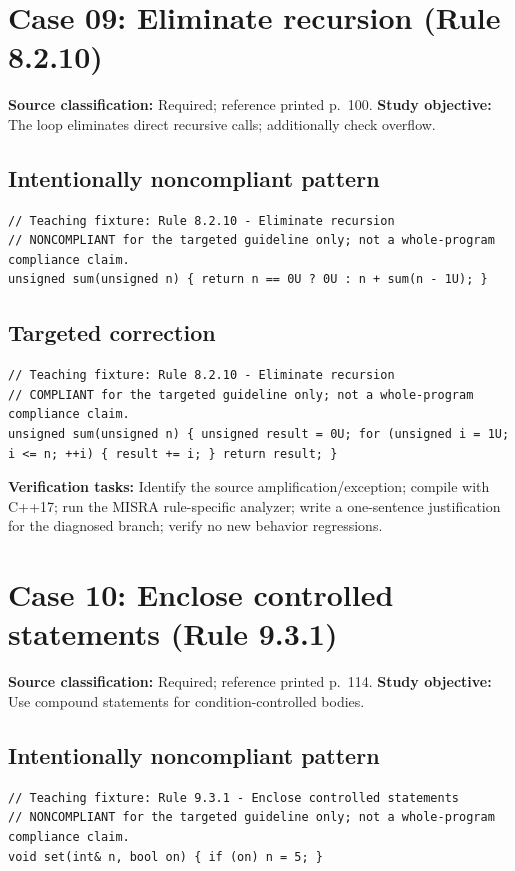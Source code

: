 \documentclass[10pt,letterpaper]{article}
\begin{document}
\section{Case 09: Eliminate recursion (Rule 8.2.10)}
\textbf{Source classification:} Required; reference printed p.~100. \textbf{Study objective:} The loop eliminates direct recursive calls; additionally check overflow.
\subsection*{Intentionally noncompliant pattern}
\begin{lstlisting}
// Teaching fixture: Rule 8.2.10 - Eliminate recursion
// NONCOMPLIANT for the targeted guideline only; not a whole-program compliance claim.
unsigned sum(unsigned n) { return n == 0U ? 0U : n + sum(n - 1U); }
\end{lstlisting}
\subsection*{Targeted correction}
\begin{lstlisting}
// Teaching fixture: Rule 8.2.10 - Eliminate recursion
// COMPLIANT for the targeted guideline only; not a whole-program compliance claim.
unsigned sum(unsigned n) { unsigned result = 0U; for (unsigned i = 1U; i <= n; ++i) { result += i; } return result; }
\end{lstlisting}
\textbf{Verification tasks:} Identify the source amplification/exception; compile with C++17; run the MISRA rule-specific analyzer; write a one-sentence justification for the diagnosed branch; verify no new behavior regressions.

\section{Case 10: Enclose controlled statements (Rule 9.3.1)}
\textbf{Source classification:} Required; reference printed p.~114. \textbf{Study objective:} Use compound statements for condition-controlled bodies.
\subsection*{Intentionally noncompliant pattern}
\begin{lstlisting}
// Teaching fixture: Rule 9.3.1 - Enclose controlled statements
// NONCOMPLIANT for the targeted guideline only; not a whole-program compliance claim.
void set(int& n, bool on) { if (on) n = 5; }
\end{lstlisting}
\end{document}
